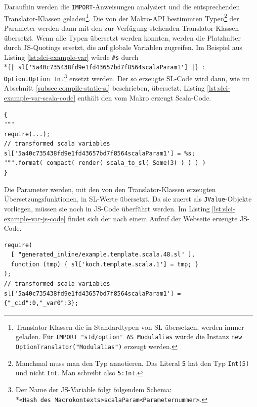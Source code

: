 \documentclass[12pt,bibtotoc]{scrreprt}
\begin{document}
Daraufhin werden die \lstinline!IMPORT!-Anweisungen analysiert und die entsprechenden Translator-Klassen geladen\footnote{Translator-Klassen die in Standardtypen von SL übersetzen, werden immer geladen. Für \lstinline!IMPORT "std/option" AS Modulalias! würde die Instanz \lstinline!new OptionTranslator("Modulalias")! erzeugt werden.}.  Die von der Makro-API bestimmten Typen\footnote{Manchmal muss man den Typ annotieren. Das Literal \lstinline!5! hat den Typ \lstinline!Int(5)! und nicht \lstinline!Int!. Man schreibt also \lstinline!5:Int!.} der Parameter werden dann mit den zur Verfügung stehenden Translator-Klassen übersetzt.
Wenn alle Typen übersetzt werden konnten, werden die Platzhalter durch \ac{JS}-Quotings ersetzt, die auf globale Variablen zugreifen. Im Beispiel aus Listing \ref{lst:slci-example-var} würde \lstinline!#s! durch \\*\lstinline!{| sl['5a40c735438fd9e1fd43657bd7f8564scalaParam1'] |} : Option.Option Int!\footnote{Der Name der JS-Variable folgt folgendem Schema: \\*\lstinline!<Hash des Macrokontexts>scalaParam<Parameternummer>!.} ersetzt werden. Der so erzeugte SL-Code wird dann, wie im Abschnitt \ref{subsec:compile-static-sl} beschrieben, übersetzt. 
Listing \ref{lst:slci-example-var-scala-code} enthält den vom Makro erzeugt Scala-Code. 

\begin{lstlisting}[caption={Erzeugter Scala-Code zum Listing \ref{lst:slci-example-var}}, label=lst:slci-example-var-scala-code, float=h]
{ 
"""
require(...);
// transformed scala variables    
sl['5a40c735438fd9e1fd43657bd7f8564scalaParam1'] = %s;
""".format( compact( render( scala_to_sl( Some(3) ) ) ) )
}
\end{lstlisting}

Die Parameter werden, mit den von den Translator-Klassen erzeugten Übersetzungsfunktionen, in \ac{SL}-Werte übersetzt. Da sie zuerst als \lstinline!JValue!-Objekte vorliegen, müssen sie noch in \ac{JS}-Code überführt werden. Im Listing \ref{lst:slci-example-var-js-code} findet sich der nach einem Aufruf der Webseite erzeugte \ac{JS}-Code.

\begin{lstlisting}[caption={JS-Code zum Listing \ref{lst:slci-example-var}}, label=lst:slci-example-var-js-code, float=h]
require( 
  [ "generated_inline/example.template.scala.48.sl" ],
  function (tmp) { sl['koch.template.scala.1'] = tmp; }
);
// transformed scala variables 
sl['5a40c735438fd9e1fd43657bd7f8564scalaParam1'] = {"_cid":0,"_var0":3};
\end{lstlisting}
\end{document}
